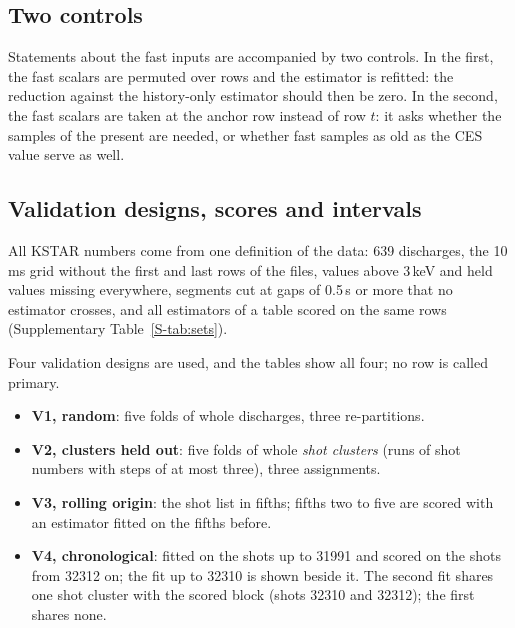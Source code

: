 \documentclass[11pt,a4paper]{article}
\newcommand{\SuppTab}[1]{Supplementary Table~\ref{S-#1}}
\begin{document}
\subsection{Two controls}
\label{sec:methods:controls}

Statements about the fast inputs are accompanied by two controls. In the first, the fast
scalars are permuted over rows and the estimator is refitted: the reduction against the
history-only estimator should then be zero. In the second, the fast scalars are taken at
the anchor row instead of row $t$: it asks whether the samples of the present are needed,
or whether fast samples as old as the CES value serve as well.

\subsection{Validation designs, scores and intervals}
\label{sec:methods:designs}

All KSTAR numbers come from one definition of the data: 639 discharges, the 10\,ms grid
without the first and last rows of the files, values above 3\,keV and held values missing
everywhere, segments cut at gaps of 0.5\,s or more that no estimator crosses, and all
estimators of a table scored on the same rows (\SuppTab{tab:sets}).

Four validation designs are used, and the tables show all four; no row is called primary.
\begin{itemize}\setlength{\itemsep}{1pt}\setlength{\parskip}{0pt}
\item \textbf{V1, random}: five folds of whole discharges, three re-partitions.
\item \textbf{V2, clusters held out}: five folds of whole \emph{shot clusters} (runs of
shot numbers with steps of at most three), three assignments.
\item \textbf{V3, rolling origin}: the shot list in fifths; fifths two to five are scored
with an estimator fitted on the fifths before.
\item \textbf{V4, chronological}: fitted on the shots up to 31991 and scored on the shots
from 32312 on; the fit up to 32310 is shown beside it. The second fit shares one shot
cluster with the scored block (shots 32310 and 32312); the first shares none.
\end{itemize}
\end{document}
